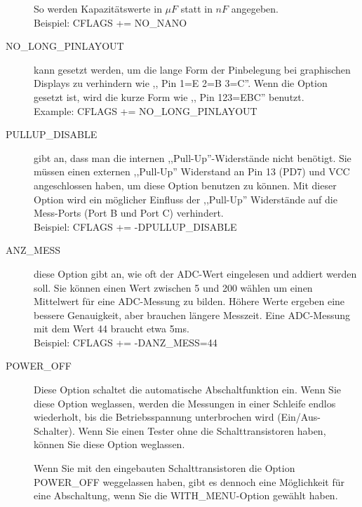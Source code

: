 \begin{description}
So werden Kapazitätswerte in \(\mu F\) statt in \(nF\) angegeben.\\
Beispiel: CFLAGS += NO\_NANO
  \item[NO\_LONG\_PINLAYOUT] kann gesetzt werden, um die lange Form der Pinbelegung bei graphischen Displays zu verhindern
 wie ,, Pin  1=E 2=B 3=C''.
Wenn die Option gesetzt ist, wird die kurze Form wie ,, Pin  123=EBC'' benutzt.\\
Example: CFLAGS += NO\_LONG\_PINLAYOUT
  \item[PULLUP\_DISABLE] gibt an, dass man die internen ,,Pull-Up''-Widerstände nicht benötigt.
 Sie müssen einen externen ,,Pull-Up'' Widerstand an Pin 13 (PD7) und VCC angeschlossen haben, um diese
Option benutzen zu können.
Mit dieser Option wird ein möglicher Einfluss der ,,Pull-Up'' Widerstände auf die Mess-Ports (Port B und Port C) verhindert.\\
Beispiel: CFLAGS += -DPULLUP\_DISABLE

  \item[ANZ\_MESS] diese Option gibt an, wie oft der ADC-Wert eingelesen und addiert werden soll.
Sie können einen Wert zwischen 5 und 200 wählen um einen Mittelwert für eine ADC-Messung zu bilden.
Höhere Werte ergeben eine bessere Genauigkeit, aber brauchen längere Messzeit.
Eine ADC-Messung mit dem Wert 44 braucht etwa 5ms.\\
Beispiel: CFLAGS += -DANZ\_MESS=44

  \item[POWER\_OFF] Diese Option schaltet die automatische Abschaltfunktion ein.
Wenn Sie diese Option weglassen, werden die Messungen in einer Schleife endlos wiederholt, bis die Betriebsspannung 
unterbrochen wird (Ein/Aus-Schalter).
Wenn Sie einen Tester ohne die Schalttransistoren haben, können Sie diese Option weglassen.

Wenn Sie mit den eingebauten Schalttransistoren die Option POWER\_OFF weggelassen haben,
gibt es dennoch eine Möglichkeit für eine Abschaltung, wenn Sie die WITH\_MENU-Option gewählt haben.


\end{description}
